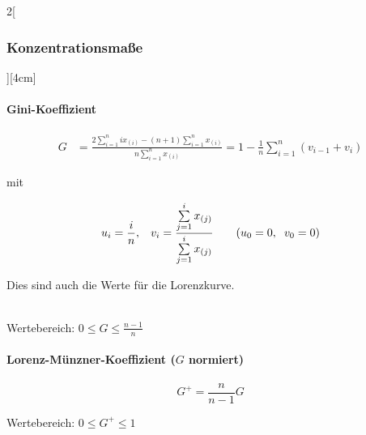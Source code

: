 \documentclass[8pt]{extarticle}
\begin{document}
\begin{multicols}{2}[\subsubsection{Konzentrationsmaße}][4cm] 

\paragraph{Gini-Koeffizient}

\begin{equation*} 
\begin{split}
G & = \frac{2\sum\limits_{i=1}^n ix_{(i)}-(n+1)\sum\limits_{i=1}^n x_{(i)}}{n\sum\limits_{i=1}^n x_{(i)}}  = 1-\frac{1}{n}\sum\limits_{i=1}^n(v_{i-1}+v_i)
\end{split}
\end{equation*}

mit

$$  u_i=\frac{i}{n}, \hspace{0.3cm} v_i= \frac{\sum\limits_{j=1}^i x_{(j)}}{\sum\limits_{j=1}^i x_{(j)}} \hspace{0.7cm} (u_0=0, \hspace{0.2cm} v_0=0 )$$


\noindent Dies sind auch die Werte für die Lorenzkurve.

\ \\

\indent Wertebereich: $ 0 \le G \le \frac{n-1}{n}$




\paragraph{Lorenz-Münzner-Koeffizient ($G$ normiert)}

$$G^+=\frac{n}{n-1}G$$

\indent Wertebereich: $ 0 \le G^+ \le 1$






\end{multicols}
\end{document}
